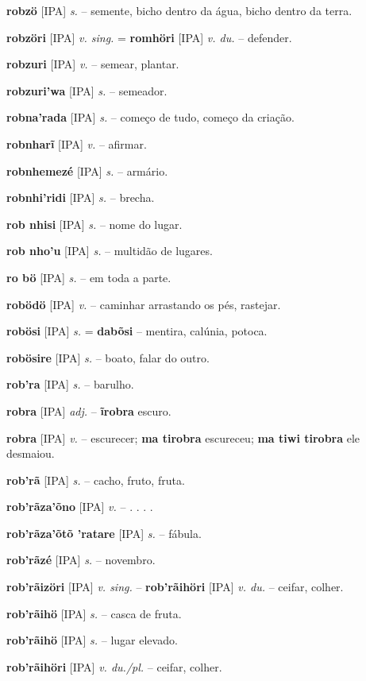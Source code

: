 \textbf{robzö} [IPA] \textit{s.} -- semente, bicho dentro da água, bicho dentro da terra.

\textbf{robzöri} [IPA] \textit{v. sing.} = \textbf{romhöri} [IPA] \textit{v. du.} -- defender.

\textbf{robzuri} [IPA] \textit{v.} -- semear, plantar.

\textbf{robzuri'wa} [IPA] \textit{s.} -- semeador.

\textbf{robna'rada} [IPA] \textit{s.} -- começo de tudo, começo da criação.

\textbf{robnharĩ} [IPA] \textit{v.} -- afirmar.

\textbf{robnhemezé} [IPA] \textit{s.} -- armário.

\textbf{robnhi'ridi} [IPA] \textit{s.} -- brecha.

\textbf{rob nhisi} [IPA] \textit{s.} -- nome do lugar.

\textbf{rob nho'u} [IPA] \textit{s.} -- multidão de lugares.

\textbf{ro bö} [IPA] \textit{s.} -- em toda a parte.

\textbf{robödö} [IPA] \textit{v.} -- caminhar arrastando os pés, rastejar.

\textbf{robösi} [IPA] \textit{s.} = \textbf{dabõsi} -- mentira, calúnia, potoca.

\textbf{robösire} [IPA] \textit{s.} -- boato, falar do outro.

\textbf{rob'ra} [IPA] \textit{s.} -- barulho.

\textbf{robra} [IPA] \textit{adj.} -- \textbf{ĩrobra} escuro.

\textbf{robra} [IPA] \textit{v.} -- escurecer; \textbf{ma tirobra} escureceu; \textbf{ma tiwi tirobra} ele desmaiou.

\textbf{rob'rã} [IPA] \textit{s.} -- cacho, fruto, fruta.

\textbf{rob'rãza'õno} [IPA] \textit{v.} -- . . . .

\textbf{rob'rãza'õtõ 'ratare} [IPA] \textit{s.} -- fábula.

\textbf{rob'rãzé} [IPA] \textit{s.} -- novembro.

\textbf{rob'rãizöri} [IPA] \textit{v. sing.} -- \textbf{rob'rãihöri} [IPA] \textit{v. du.} -- ceifar, colher.

\textbf{rob'rãihö} [IPA] \textit{s.} -- casca de fruta.

\textbf{rob'rãihö} [IPA] \textit{s.} -- lugar elevado.

\textbf{rob'rãihöri} [IPA] \textit{v. du./pl.} -- ceifar, colher.

